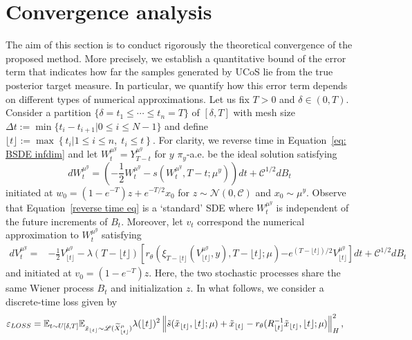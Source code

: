 \documentclass[10pt]{article} %
\def\Eqref#1{Equation~\ref{#1}}
\newcommand{\E}{\mathbb{E}}
\theoremstyle{plain}
\theoremstyle{definition}
\theoremstyle{remark}
\renewcommand{\L}{\mathscr{L}}
\newcommand{\norm}[1]{\left\|#1\right\|}
\newcommand{\C}{\mathcal C}
\newcommand{\N}{\mathcal N}
\newcommand{\low}[1]{{\lfloor #1 \rfloor}}
\begin{document}
\section{Convergence analysis}\label{sec: Estimating numerical errors}

The aim of this section is to conduct rigorously the theoretical convergence of the proposed method. More precisely, we establish a quantitative bound of the error term that indicates how far the samples generated by UCoS lie from the true posterior target measure. In particular, we quantify how this error term depends on different types of numerical approximations. Let us fix $T >0$ and $\delta \in (0, T)$. 
Consider a partition $\{\delta = t_1 \le \cdots \le t_n = T \}$ of $[\delta, T]$ with mesh size $\Delta t := \min\{t_i - t_{i+1} | 0 \le i \le N-1\}$ and define $\low{t}:= \max \left\{t_i | 1 \le i \le n, \; t_i \le t\right\}$. 
For clarity, we reverse time in \Eqref{eq: BSDE infdim} and let $W_t^{\mu^y} = Y_{T-t}^{\mu^y}$ for $y$ $\pi_y$-a.e. be the ideal solution satisfying
\begin{equation}\label{reverse time eq}
    dW_t^{\mu^y} = \left(-\frac{1}{2} W_t^{\mu^y} - s(W_t^{\mu^y}, T-t; \mu^y) \right) dt + \C^{1/2} dB_t
\end{equation}
initiated at $w_0 = (1-e^{-T}) z + e^{- T/2} x_0$ for $z \sim \N(0, \C)$ and $x_0 \sim \mu^y$.
Observe that \Eqref{reverse time eq} is a `standard' SDE where $W_t^{\mu^y}$ is independent of the future increments of $B_t$. Moreover, let $v_t$ correspond the numerical approximation to $W_t^{\mu^y}$ satisfying
\begin{equation*}
\begin{aligned}
    d  V_t^{\mu^y} = & -\frac{1}{2}  V_\low{t}^{\mu^y} - \lambda(T-\low{t})\left[ r_\theta\left(\xi_{T-\low t}(V_{\low{t}}^{\mu^y}, y), T-\low{t}; \mu\right) \right. \left. - e^{(T-\low{t})/2} V_{\low{t}}^{\mu^y} \right] dt +\C^{1/2} dB_t
\end{aligned}
\end{equation*} 
and initiated at $v_0 =  (1-e^{- T}) z$. Here, the two stochastic processes share the same Wiener process $B_t$ and initialization $z$. In what follows, we consider a discrete-time loss given by
\begin{equation}
\label{eq:discrete_loss}
\begin{aligned}
    &\varepsilon_{LOSS} =  \E_{t \sim U[\delta, T]} \E_{\tilde x_{\low t} \sim  \L(\widetilde{X}_{\low t}^{\mu})} \lambda(\low t)^2\norm{\Tilde{s}(\tilde x_{\low t}, \low t; \mu) + \tilde x_{\low t} -r_\theta(R_{\low t}^{-1} \tilde x_{\low t}, \low t; \mu)}_H^2,
\end{aligned}
\end{equation}
\end{document}
